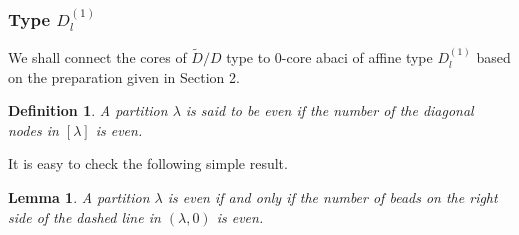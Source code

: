 \documentclass[11pt]{amsart}
\theoremstyle{plain}
\numberwithin{equation}{subsection}
\newtheorem{lemma}[theorem]{Lemma}
\newtheorem{definition}[theorem]{Definition}
\newcommand{\lam}{\lambda}
\def\bs{{\mathbf s}}
\def\blam{{\boldsymbol \lambda}}
\def\bs{{\bf s}}
\begin{document}

\subsubsection{Type $D^{(1)}_l$}
We shall connect the cores of $\tilde{D}/D$ type to $0$-core abaci of affine type $D_l^{(1)}$ based on the preparation given in Section 2. 
\begin{definition}\cite[Definition 5.1]{HJ2}\label{3.19}
A partition $\lam$ is said to be even if the number of the diagonal nodes in $[\lam]$ is even.
\end{definition}

It is easy to check the following simple result.
\begin{lemma}\label{3.20}
A partition $\lam$ is even if and only if the number of beads on the right side of the dashed line in $(\lam, 0)$ is even.
\end{lemma}

\end{document}
